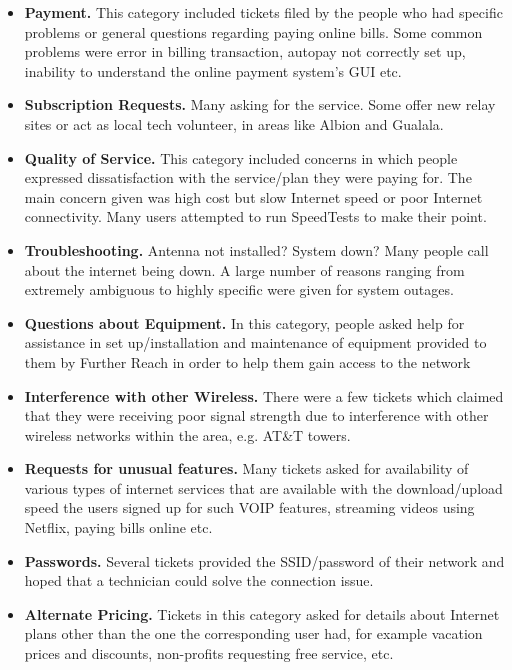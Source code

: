 \begin{itemize}
\item \textbf{Payment.} This category included tickets filed by the people who had specific problems or general questions regarding paying online bills. Some common problems were error in billing transaction, autopay not correctly set up, inability to understand the online payment system’s GUI etc.
\item \textbf{Subscription Requests.} Many asking for the service. Some offer new relay
  sites or act as local tech volunteer, in areas like Albion and Gualala. %
\item \textbf{Quality of Service.} This category included concerns in which people expressed dissatisfaction with the service/plan they were paying for. 
The main concern given was high cost but slow Internet speed or poor Internet
connectivity. Many users attempted to run SpeedTests to make their point.
\item \textbf{Troubleshooting.} Antenna not installed? System down? Many people call
  about the internet being down. A large number of reasons ranging from extremely ambiguous to highly specific were given for system outages.
\item \textbf{Questions about Equipment.} In this category, people asked help for assistance in set up/installation and maintenance of equipment provided to them by Further Reach in order to help them gain access to the network
\item \textbf{Interference with other Wireless.} There were a few tickets which claimed
that they were receiving poor signal strength due to interference with other
wireless networks within the area, e.g. AT\&T towers.
\item \textbf{Requests for unusual features.} Many tickets asked for availability of various types of internet services that are available with the download/upload speed the users signed up for such VOIP features, streaming videos using Netflix, paying bills online etc.
\item \textbf{Passwords.} Several tickets provided the SSID/password of their
network and hoped that a technician could solve the connection issue.
\item \textbf{Alternate Pricing.} Tickets in this category asked for details about
Internet plans other than the one the corresponding user had, for example
vacation prices and discounts, non-profits requesting free service, etc.
\end{itemize}


